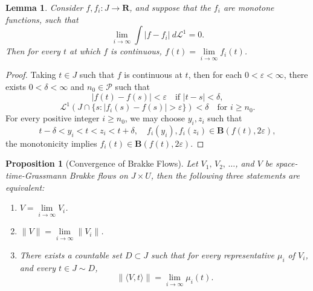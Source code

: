 \documentclass{article}
\theoremstyle{plain}
\theoremstyle{definition}
\theoremstyle{plain}
\newtheorem{lemma}[theorem]{Lemma}
\newtheorem{proposition}[theorem]{Proposition}
\theoremstyle{remark}
\theoremstyle{remark}
\theoremstyle{plain}
\begin{document}
\begin{lemma}\label{convergence of monotone BV}
    Consider $f,f_i : J \to \mathbf R$, and suppose that the $f_{i}$ are monotone functions, such that
    \[\textstyle  \lim\limits_{i\to\infty}\int |f-f_i| \ d \mathscr L^1 = 0.\]
    Then for every  $t$ at which $f$ is continuous, $f(t) = \lim\limits_{i\to\infty}f_i(t)$. 
\end{lemma}
\begin{proof}
    Taking $t \in J$ such that $f$ is continuous at $t$, then for each $0<\varepsilon<\infty$, there exists $0<\delta<\infty$ and 
    $n_0\in \mathscr P$ such that 
    \[ |f(t)-f(s)| < \varepsilon \quad \text{if $|t-s|<\delta$},\]
    \[ \mathscr L^1(J \cap \{ s : |f_i(s)-f(s)|>\varepsilon\}) < \delta \quad \text{for $i\geq n_0$}.\]
    For every positive integer $i\geq n_0$, we may
    choose $y_i,z_i$ such that 
    \[ t-\delta < y_i < t < z_i < t + \delta, \quad f_i(y_i),f_i(z_i) \in \mathbf B(f(t),2 \varepsilon),\]
    the monotonicity implies $f_i(t)\in \mathbf B(f(t),2\varepsilon)$.
\end{proof}

\begin{proposition}[Convergence of Brakke Flows]\label{prop: convergence of Brakke flows} 
    Let $V_{1}, \, V_{2}, \, \ldots$, and $V$ be space-time-Grassmann Brakke flows on $J \times U$, then the following three statements are equivalent: 
    \begin{enumerate}[label=\ref{prop: convergence of Brakke flows}.\arabic{enumi}]
         \item \label{prop: convergence of Brakke flows:1} $V = \lim\limits_{i\to\infty} V_i$. 
        \item \label{prop: convergence of Brakke flows:2} $\|V\| = \lim\limits_{i\to\infty} \|V_i\|$.
        \item \label{prop: convergence of Brakke flows:3} 
        There exists a countable set $D \subset J$ such that for every representative $\mu_i$ of $V_{i}$, and every $t\in J \sim D$,
        \[
            \| \langle V, t \rangle \| = \lim\limits_{i\to\infty} \mu_i(t).
        \]
    \end{enumerate}
\end{proposition}
\end{document}

